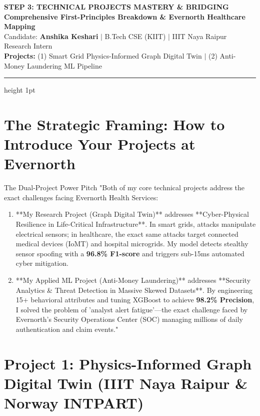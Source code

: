 \documentclass[11pt,a4paper]{article}
\begin{document}
\begin{center}
    {\LARGE \bfseries \color{primaryblue} STEP 3: TECHNICAL PROJECTS MASTERY \& BRIDGING}\\[4pt]
    {\large \bfseries Comprehensive First-Principles Breakdown \& Evernorth Healthcare Mapping}\\[2pt]
    {\small \color{darkcharcoal} Candidate: \textbf{Anshika Keshari} $|$ B.Tech CSE (KIIT) $|$ IIIT Naya Raipur Research Intern}\\[2pt]
    {\footnotesize \textbf{Projects:} (1) Smart Grid Physics-Informed Graph Digital Twin \quad $|$ \quad (2) Anti-Money Laundering ML Pipeline}
\end{center}
\vspace{-4pt}
\hrule height 1pt
\vspace{8pt}

\section{The Strategic Framing: How to Introduce Your Projects at Evernorth}

\begin{evernorthbox}{The Dual-Project Power Pitch}
"Both of my core technical projects address the exact challenges facing Evernorth Health Services:
\begin{enumerate}
    \item **My Research Project (Graph Digital Twin)** addresses **Cyber-Physical Resilience in Life-Critical Infrastructure**. In smart grids, attacks manipulate electrical sensors; in healthcare, the exact same attacks target connected medical devices (IoMT) and hospital microgrids. My model detects stealthy sensor spoofing with a \textbf{96.8\% F1-score} and triggers sub-15ms automated cyber mitigation.
    \item **My Applied ML Project (Anti-Money Laundering)** addresses **Security Analytics \& Threat Detection in Massive Skewed Datasets**. By engineering 15+ behavioral attributes and tuning XGBoost to achieve \textbf{98.2\% Precision}, I solved the problem of 'analyst alert fatigue'—the exact challenge faced by Evernorth's Security Operations Center (SOC) managing millions of daily authentication and claim events."
\end{enumerate}
\end{evernorthbox}

\section{Project 1: Physics-Informed Graph Digital Twin (IIIT Naya Raipur \& Norway INTPART)}
\end{document}
